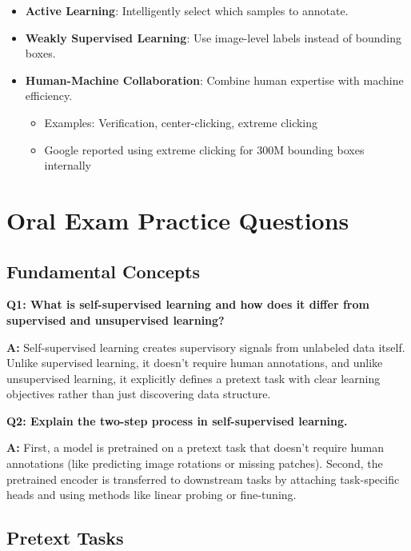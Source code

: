 \begin{itemize}
    \item \textbf{Active Learning}: Intelligently select which samples to annotate.
    
    \item \textbf{Weakly Supervised Learning}: Use image-level labels instead of bounding boxes.
    
    \item \textbf{Human-Machine Collaboration}: Combine human expertise with machine efficiency.
    \begin{itemize}
        \item Examples: Verification, center-clicking, extreme clicking
        \item Google reported using extreme clicking for 300M bounding boxes internally
    \end{itemize}
\end{itemize}
\section*{Oral Exam Practice Questions}

\subsection*{Fundamental Concepts}

\textbf{Q1: What is self-supervised learning and how does it differ from supervised and unsupervised learning?}

\textbf{A:} Self-supervised learning creates supervisory signals from unlabeled data itself. Unlike supervised learning, it doesn't require human annotations, and unlike unsupervised learning, it explicitly defines a pretext task with clear learning objectives rather than just discovering data structure.

\textbf{Q2: Explain the two-step process in self-supervised learning.}

\textbf{A:} First, a model is pretrained on a pretext task that doesn't require human annotations (like predicting image rotations or missing patches). Second, the pretrained encoder is transferred to downstream tasks by attaching task-specific heads and using methods like linear probing or fine-tuning.

\subsection*{Pretext Tasks}

